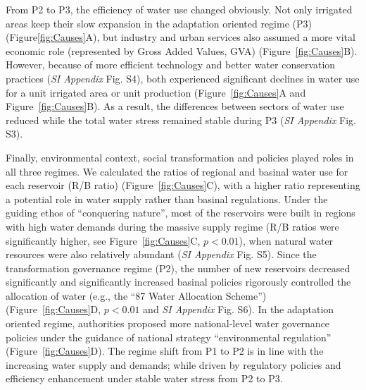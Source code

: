 From P2 to P3, the efficiency of water use changed obviously.
Not only irrigated areas keep their slow expansion in the adaptation oriented regime (P3) (Figure\ref{fig:Causes}A), but industry and urban services also assumed a more vital economic role (represented by Gross Added Values, GVA) (Figure~\ref{fig:Causes}B).
However, because of more efficient technology and better water conservation practices (\textit{SI Appendix} Fig. S4), both experienced significant declines in water use for a unit irrigated area or unit production (Figure~\ref{fig:Causes}A and Figure~\ref{fig:Causes}B).
As a result, the differences between sectors of water use reduced while the total water stress remained stable during P3 (\textit{SI Appendix} Fig. S3).

Finally, environmental context, social transformation and policies played roles in all three regimes.
We calculated the ratios of regional and basinal water use for each reservoir (R/B ratio) (Figure~\ref{fig:Causes}C), with a higher ratio representing a potential role in water supply rather than basinal regulations.
Under the guiding ethos of ``conquering nature'', most of the reservoirs were built in regions with high water demands during the massive supply regime (R/B ratios were significantly higher, see Figure~\ref{fig:Causes}C, $p<0.01$), when natural water resources were also relatively abundant (\textit{SI Appendix} Fig. S5).
Since the transformation governance regime (P2), the number of new reservoirs decreased significantly and significantly increased basinal policies rigorously controlled the allocation of water (e.g., the ``87 Water Allocation Scheme'') (Figure~\ref{fig:Causes}D, $p<0.01$ and \textit{SI Appendix} Fig. S6).
In the adaptation oriented regime, authorities proposed more national-level water governance policies under the guidance of national strategy ``environmental regulation'' (Figure~\ref{fig:Causes}D).
The regime shift from P1 to P2 is in line with the increasing water supply and demands; while driven by regulatory policies and efficiency enhancement under stable water stress from P2 to P3.
